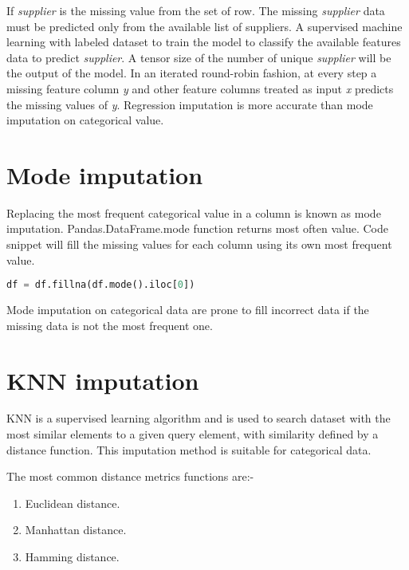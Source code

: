 If \textit{supplier} is the missing value from the set of row. The missing \textit{supplier} data must be predicted only from the available list of suppliers. A supervised machine learning with labeled dataset to train the model to classify the available features data to predict \textit{supplier}. A tensor size of the number of unique \textit{supplier} will be the output of the model. 
In an iterated round-robin fashion, at every step a missing feature column  \textit{y} and other feature columns treated as input \textit{x} predicts the missing values of \textit{y}. Regression imputation is more accurate than mode imputation on categorical value.


\section{Mode imputation}

Replacing the most frequent categorical value in a column is known as mode imputation.  Pandas.DataFrame.mode \parencite{mckinney-proc-scipy-2010} function returns most often value. Code snippet will fill the missing values for each column using its own most frequent value.

\begin{lstlisting}[language=Python, caption={Pandas DataFrames mode function}]
    df = df.fillna(df.mode().iloc[0])
\end{lstlisting}

Mode imputation on categorical data are prone to fill incorrect data if the missing data is not the most frequent one.



\section{\acf{KNN}  imputation}

\acl{KNN} is a supervised learning algorithm and is used to search dataset with the most similar elements to a given query element, with similarity defined by a distance function. This imputation method is suitable for categorical data.

The most common distance metrics functions are:-

\begin{enumerate}
    \item Euclidean distance.
    \item Manhattan distance.
    \item Hamming distance.
\end{enumerate}

